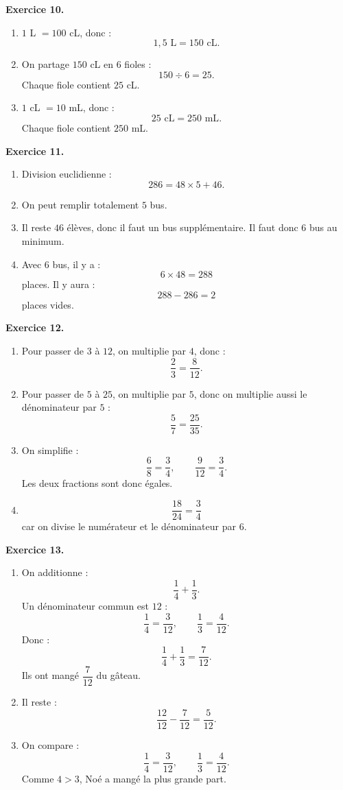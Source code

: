 \documentclass[11pt,a4paper]{article}
\newcommand{\corrige}[2]{
\begin{corrigebox}
\textbf{Exercice #1.}

#2
\end{corrigebox}
}
\begin{document}
\corrige{10}{
\begin{enumerate}[label=\arabic*)]
\item $1$ L $=100$ cL, donc :
\[
1,5\text{ L}=150\text{ cL}.
\]
\item On partage $150$ cL en $6$ fioles :
\[
150\div 6=25.
\]
Chaque fiole contient $25$ cL.
\item $1$ cL $=10$ mL, donc :
\[
25\text{ cL}=250\text{ mL}.
\]
Chaque fiole contient $250$ mL.
\end{enumerate}
}

\corrige{11}{
\begin{enumerate}[label=\arabic*)]
\item Division euclidienne :
\[
286=48\times 5+46.
\]
\item On peut remplir totalement $5$ bus.
\item Il reste $46$ élèves, donc il faut un bus supplémentaire.
Il faut donc $6$ bus au minimum.
\item Avec $6$ bus, il y a :
\[
6\times 48=288
\]
places.
Il y aura :
\[
288-286=2
\]
places vides.
\end{enumerate}
}

\corrige{12}{
\begin{enumerate}[label=\arabic*)]
\item Pour passer de $3$ à $12$, on multiplie par $4$, donc :
\[
\frac{2}{3}=\frac{8}{12}.
\]
\item Pour passer de $5$ à $25$, on multiplie par $5$, donc on multiplie aussi le dénominateur par $5$ :
\[
\frac{5}{7}=\frac{25}{35}.
\]
\item On simplifie :
\[
\frac{6}{8}=\frac{3}{4},
\qquad
\frac{9}{12}=\frac{3}{4}.
\]
Les deux fractions sont donc égales.
\item
\[
\frac{18}{24}=\frac{3}{4}
\]
car on divise le numérateur et le dénominateur par $6$.
\end{enumerate}
}

\corrige{13}{
\begin{enumerate}[label=\arabic*)]
\item On additionne :
\[
\frac{1}{4}+\frac{1}{3}.
\]
Un dénominateur commun est $12$ :
\[
\frac{1}{4}=\frac{3}{12},
\qquad
\frac{1}{3}=\frac{4}{12}.
\]
Donc :
\[
\frac{1}{4}+\frac{1}{3}=\frac{7}{12}.
\]
Ils ont mangé $\dfrac{7}{12}$ du gâteau.
\item Il reste :
\[
\frac{12}{12}-\frac{7}{12}=\frac{5}{12}.
\]
\item On compare :
\[
\frac{1}{4}=\frac{3}{12},
\qquad
\frac{1}{3}=\frac{4}{12}.
\]
Comme $4>3$, Noé a mangé la plus grande part.
\end{enumerate}
}
\end{document}
